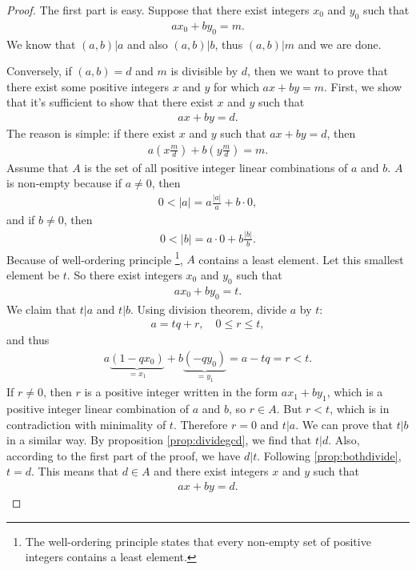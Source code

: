 \documentclass{subfile}
\begin{document}
	\begin{proof}
		The first part is easy. Suppose that there exist integers $x_0$ and $y_0$ such that
		\begin{align*} ax_0 + by_0 = m.\end{align*}
		We know that $(a,b)|a$ and also $(a,b)|b$, thus $(a,b) | m$ and we are done.
		
		Conversely, if $(a,b)=d$ and $m$ is divisible by $d$, then we want to prove that there exist some positive integers $x$ and $y$ for which $ax+by=m$. First, we show that it's sufficient to show that there exist $x$ and $y$ such that
		\begin{align*} ax + by = d.\end{align*}
		The reason is simple: if there exist $x$ and $y$ such that $ax + by = d$, then
		\begin{align*} a\left( x \frac{m}{d} \right)  + b \left( y \frac{m}{d} \right) = m.\end{align*}
		Assume that $A$ is the set of all positive integer linear combinations of $a$ and $b$. $A$ is non-empty because if $a \neq 0$, then
		\begin{align*}	0<|a| = a\frac{|a|}{a} + b\cdot 0, \end{align*}
		and if $b \neq 0$, then
		\begin{align*}	0<|b| =  a\cdot 0 + b \frac{|b|}{b}. \end{align*}
		Because of well-ordering principle \footnote{The well-ordering principle states that every non-empty set of positive integers contains a least element.}, $A$ contains a least element. Let this smallest element be $t$. So there exist integers $x_0$ and $y_0$ such that
		\begin{align*} ax_0 + by_0 = t.\end{align*}
		We claim that $t|a$ and $t|b$. Using division theorem, divide $a$ by $t$:
		\begin{align*} a = tq+r, \quad 0 \leq r \leq t,\end{align*}
		and thus
		\begin{align*} a\underbrace{(1-qx_0)}_{=x_1}+b\underbrace{(-qy_0)}_{=y_1}=a-tq=r<t.	\end{align*}
		If $r \neq 0$, then $r$ is a positive integer written in the form $ax_1+by_1$, which is a positive integer linear combination of $a$ and $b$, so $r \in A$. But $r<t$, which is in contradiction with minimality of $t$. Therefore $r=0$ and $t|a$. We can prove that $t|b$ in a similar way. By proposition \eqref{prop:dividegcd}, we find that $t|d$. Also, according to the first part of the proof, we have $d|t$. Following \eqref{prop:bothdivide}, $t=d$. This means that $d \in A$ and there exist integers $x$ and $y$ such that
		\begin{align*} ax + by = d.\end{align*}
	\end{proof}
	
\end{document}
